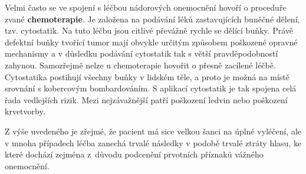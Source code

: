 Velmi často se ve spojení s léčbou nádorových onemocnění hovoří o proceduře zvané
\textbf{chemoterapie}. Je založena na podávání léků zastavujících buněčné
dělení, tzv. cytostatik. %
Na tuto léčbu jsou citlivé převážně rychle se dělící buňky.
Právě defektní buňky tvořící tumor mají obvykle určitým způsobem poškozené opravné
mechanismy a v důsledku podávání cytostatik tak s větší pravděpodobností
zahynou. Samozřejmě nelze u chemoterapie hovořit o přesně zacílené léčbě.
Cytostatika postihují všechny buňky v lidském těle, a proto je možná na místě
srovnání s kobercovým bombardováním. S aplikací cytostatik je tak
spojena celá řada vedlejších rizik. Mezi nejzávažnější patří poškození ledvin
nebo poškození krvetvorby.


Z výše uvedeného je zřejmé, že pacient má sice velkou šanci na úplné
vyléčení, ale v mnoha případech léčba zanechá trvalé následky v podobě trvalé ztráty
hlasu, ke které dochází zejména z~důvodu podcenění prvotních příznaků vážného onemocnění.


